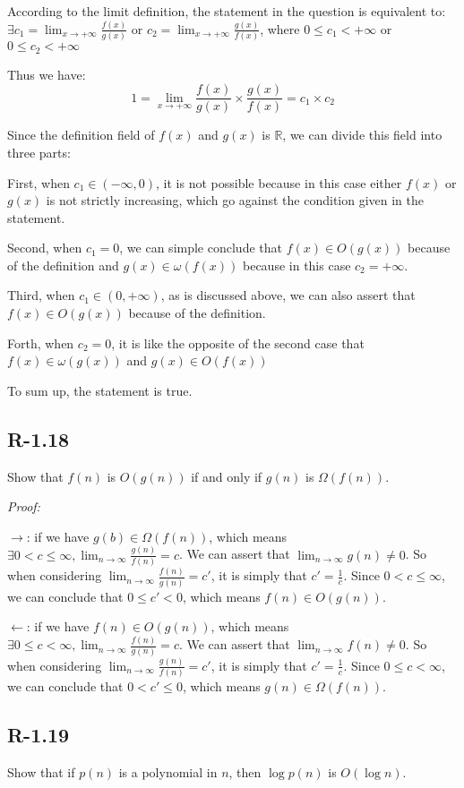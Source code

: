 \documentclass[11pt]{article}
\begin{document}
	According to the limit definition, the statement in the question is equivalent to: $\exists c_1=\lim_{x\to+\infty} \frac{f(x)}{g(x)}$ or $c_2=\lim_{x\to+\infty}\frac{g(x)}{f(x)}$, where $0\leq c_1<+\infty$ or $0\leq c_2<+\infty$
	
	Thus we have:
	\begin{equation*}
		1=\lim_{x\to+\infty} \frac{f(x)}{g(x)} \times \frac{g(x)}{f(x)} = c_1 \times c_2
	\end{equation*}
	
	Since the definition field of $f(x)$ and $g(x)$ is $\mathbb{R}$, we can divide this field into three parts:
	
	First, when $c_1 \in (-\infty,0)$, it is not possible because in this case either $f(x)$ or $g(x)$ is not strictly increasing, which go against the condition given in the statement.
	
	Second, when $c_1 = 0$, we can simple conclude that $f(x)\in O(g(x))$ because of the definition and $g(x)\in \omega(f(x))$ because in this case $c_2 = +\infty$.
	
	Third, when $c_1 \in(0,+\infty)$, as is discussed above, we can also assert that $f(x)\in O(g(x))$ because of the definition.
	
	Forth, when $c_2 = 0$, it is like the opposite of the second case that $f(x)\in \omega(g(x))$ and $g(x)\in O(f(x))$
	
	To sum up, the statement is true.
\subsection{R-1.18}
	Show that $f(n)$ is $O(g(n))$ if and only if $g(n)$ is $\Omega(f(n))$.

	\emph{Proof:}

	$\to$: if we have $g(b)\in \Omega(f(n))$, which means $\exists 0<c\leq \infty, \lim_{n\to\infty} \frac{g(n)}{f(n)}=c$. We can assert that $\lim_{n\to\infty}g(n) \not =0$. So when considering $\lim_{n\to\infty}\frac{f(n)}{g(n)} =c'$, it is simply that $c' =\frac{1}{c}$. Since $0<c\leq \infty$, we can conclude that $0\leq c'<0$, which means $f(n)\in O(g(n))$.
	
	$\gets$: if we have $f(n)\in O(g(n))$, which means $\exists 0\leq c< \infty, \lim_{n\to\infty} \frac{f(n)}{g(n)}=c$. We can assert that $\lim_{n\to\infty}f(n) \not =0$. So when considering $\lim_{n\to\infty}\frac{g(n)}{f(n)} =c'$, it is simply that $c' =\frac{1}{c}$. Since $0\leq c< \infty$, we can conclude that $0< c'\leq0$, which means $g(n) \in \Omega(f(n))$.
\subsection{R-1.19}
	Show that if $p(n)$ is a polynomial in $n$, then $\log p(n)$ is $O(\log n)$.
\end{document}
